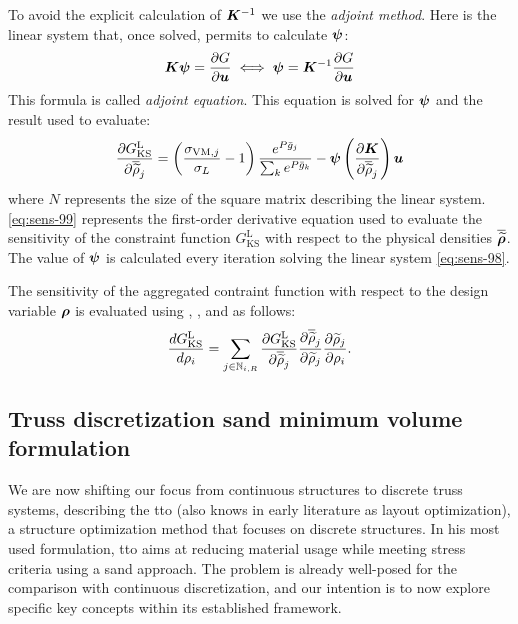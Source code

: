 To avoid the explicit calculation of $\bm{K}^{-1}$ we use the \textit{adjoint method}. Here is the linear system that, once solved, permits to calculate $\bm{\psi}$:
\begin{equation} \label{eq:sens-98}
    \bm{K}\bm{\psi} = \frac{\partial G}{\partial\bm{u}} \iff \bm{\psi} = \bm{K}^{-1}\frac{\partial G}{\partial\bm{u}}
\end{equation}
This formula is called \textit{adjoint equation}. This equation is solved for $\bm{\psi}$ and the result used to evaluate:
\begin{equation}\label{eq:sens-99}
\frac{\partial G_{\text{KS}}^\text{L}}{\partial\overline{\widetilde{\rho}}_j} = \left(\frac{ \sigma_{\text{VM},j}}{\sigma_L}-1 \right) \frac{e^{{P}\bar{g}_j}}{\sum_k e^{{P}\bar{g}_k}} - \bm{\psi} \left(\frac{\partial\bm{K}}{\partial\overline{\widetilde{\rho}}_{j}}\right) \bm{u}
\end{equation}
 where $N$ represents the size of the square matrix describing the linear system.
\eqref{eq:sens-99} represents the first-order derivative equation used to evaluate the sensitivity of the constraint function $G_{\text{KS}}^\text{L}$ with respect to the physical densities $\bm{\overline{\widetilde{\rho}}}$. The value of $\bm{\psi}$ is calculated every iteration solving the linear system \ref{eq:sens-98}.

The sensitivity of the aggregated contraint function with respect to the design variable $\bm{\rho}$ is evaluated using  , , and  as follows:
\begin{equation}
    \frac{d G_{\text{KS}}^\text{L}}{d \rho_i} = \sum_{j \in \mathbb{N}_{i,R}} \frac{\partial G_{\text{KS}}^\text{L}}{\partial\overline{\widetilde{\rho}}_j} \frac{\partial\overline{\widetilde{\rho}}_j}{\partial\widetilde{\rho}_j} \frac{\partial\widetilde{\rho}_j}{\partial\rho_i}.
\end{equation}

\subsection{Truss discretization \gls{sand} minimum volume formulation}
We are now shifting our focus from continuous structures to discrete truss systems, describing the \gls{tto} (also knows in early literature as layout optimization), a structure optimization method that focuses on discrete structures. In his most used formulation, \gls{tto} aims at reducing material usage while meeting stress criteria using a \gls{sand} approach. The problem is already well-posed for the comparison with continuous discretization, and our intention is to now explore specific key concepts within its established framework.
